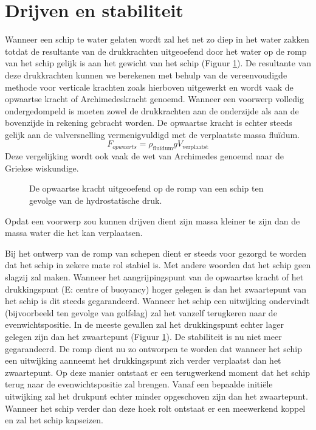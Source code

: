 	\section{Drijven en stabiliteit}
Wanneer een schip te water gelaten wordt zal het net zo diep in het water zakken totdat de resultante van de drukkrachten uitgeoefend door het water op de romp van het schip gelijk is aan het gewicht van het schip (Figuur \ref{fig:opwaartse_kracht}). De resultante van deze drukkrachten kunnen we berekenen met behulp van de vereenvoudigde methode voor verticale krachten zoals hierboven uitgewerkt en wordt vaak de opwaartse kracht of Archimedeskracht genoemd. Wanneer een voorwerp volledig ondergedompeld is moeten zowel de drukkrachten aan de onderzijde als aan de bovenzijde in rekening gebracht worden. De opwaartse kracht is echter steeds gelijk aan de valversnelling vermenigvuldigd met de verplaatste massa fluïdum.
\begin{equation}
	F_{opwaarts} = \rho_{\text{fluïdum}} g V_{\text{verplaatst}}
\end{equation}
Deze vergelijking wordt ook vaak de wet van Archimedes genoemd naar de Griekse wiskundige.
\begin{figure}[htb]
	\centering
	
	\caption{De opwaartse kracht uitgeoefend op de romp van een schip ten gevolge van de hydrostatische druk.}
	\label{fig:opwaartse_kracht}
\end{figure}

Opdat een voorwerp zou kunnen drijven dient zijn massa kleiner te zijn dan de massa water die het kan verplaatsen.

Bij het ontwerp van de romp van schepen dient er steeds voor gezorgd te worden dat het schip in zekere mate rol stabiel is. Met andere woorden dat het schip geen slagzij zal maken. Wanneer het aangrijpingspunt van de opwaartse kracht of het drukkingspunt (E: centre of buoyancy) hoger gelegen is dan het zwaartepunt van het schip is dit steeds gegarandeerd. Wanneer het schip een uitwijking ondervindt (bijvoorbeeld ten gevolge van golfslag) zal het vanzelf terugkeren naar de evenwichtspositie. In de meeste gevallen zal het drukkingspunt echter lager gelegen zijn dan het zwaartepunt (Figuur \ref{fig:opwaartse_kracht}). De stabiliteit is nu niet meer gegarandeerd. De romp dient nu zo ontworpen te worden dat wanneer het schip een uitwijking aanneemt het drukkingspunt zich verder verplaatst dan het zwaartepunt. Op deze manier ontstaat er een terugwerkend moment dat het schip terug naar de evenwichtspositie zal brengen. Vanaf een bepaalde initiële uitwijking zal het drukpunt echter minder opgeschoven zijn dan het zwaartepunt. Wanneer het schip verder dan deze hoek rolt ontstaat er een meewerkend koppel en zal het schip kapseizen.